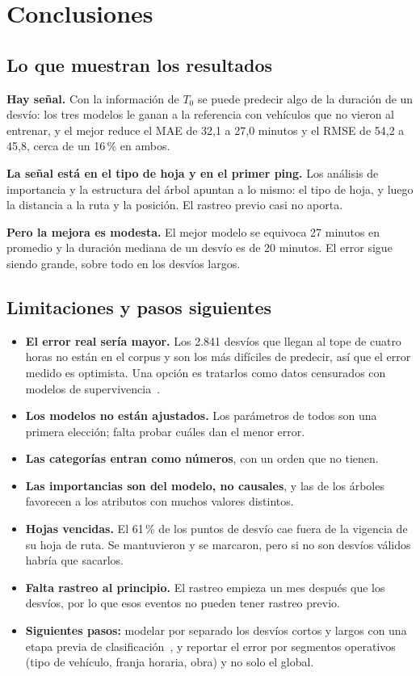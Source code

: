 \documentclass[11pt,a4paper]{article}
\begin{document}
\section{Conclusiones}

\subsection{Lo que muestran los resultados}

\textbf{Hay señal.} Con la información de $T_0$ se puede predecir algo de la duración de un desvío: los
tres modelos le ganan a la referencia con vehículos que no vieron al entrenar, y el mejor reduce el MAE de 32,1 a
27,0 minutos y el RMSE de 54,2 a 45,8, cerca de un 16\,\% en ambos.

\textbf{La señal está en el tipo de hoja y en el primer ping.} Los análisis de importancia y la estructura
del árbol apuntan a lo mismo: el tipo de hoja, y luego la distancia a la ruta y la posición. El rastreo
previo casi no aporta.

\textbf{Pero la mejora es modesta.} El mejor modelo se equivoca 27 minutos en promedio y la duración mediana
de un desvío es de 20 minutos. El error sigue siendo grande, sobre todo en los desvíos largos.

\subsection{Limitaciones y pasos siguientes}

\begin{itemize}[nosep]
  \item \textbf{El error real sería mayor.} Los 2.841 desvíos que llegan al tope de cuatro horas no están en
  el corpus y son los más difíciles de predecir, así que el error medido es optimista. Una opción es
  tratarlos como datos censurados con modelos de supervivencia~\cite{hojati}.
  \item \textbf{Los modelos no están ajustados.} Los parámetros de todos son una primera elección;
  falta probar cuáles dan el menor error.
  \item \textbf{Las categorías entran como números}, con un orden que no tienen.
  \item \textbf{Las importancias son del modelo, no causales}, y las de los árboles favorecen a los
  atributos con muchos valores distintos.
  \item \textbf{Hojas vencidas.} El 61\,\% de los puntos de desvío cae fuera de la vigencia de su hoja de
  ruta. Se mantuvieron y se marcaron, pero si no son desvíos válidos habría que sacarlos.
  \item \textbf{Falta rastreo al principio.} El rastreo empieza un mes después que los desvíos, por lo que
  esos eventos no pueden tener rastreo previo.
  \item \textbf{Siguientes pasos:} modelar por separado los desvíos cortos y largos con una etapa previa de
  clasificación~\cite{grigorev}, y reportar el error por segmentos operativos (tipo de vehículo, franja
  horaria, obra) y no solo el global.
\end{itemize}
\end{document}
